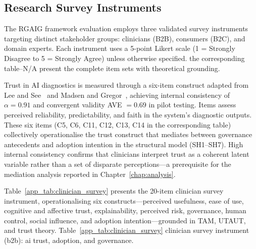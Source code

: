 \subsection{Research Survey Instruments}
\label{app_sec:survey_instruments}

The RGAIG framework evaluation employs three validated survey instruments targeting distinct stakeholder groups: clinicians (B2B), consumers (B2C), and domain experts. Each instrument uses a 5-point Likert scale (1 = Strongly Disagree to 5 = Strongly Agree) unless otherwise specified. the corresponding table--N/A present the complete item sets with theoretical grounding.

Trust in AI diagnostics is measured through a six-item construct adapted from Lee and See~\cite{lee2004trust} and Madsen and Gregor~\cite{madsen2000measuring}, achieving internal consistency of $\alpha = 0.91$ and convergent validity AVE $= 0.69$ in pilot testing. Items assess perceived reliability, predictability, and faith in the system's diagnostic outputs. These six items (C5, C6, C11, C12, C13, C14 in the corresponding table) collectively operationalise the trust construct that mediates between governance antecedents and adoption intention in the structural model (SH1--SH7). High internal consistency confirms that clinicians interpret trust as a coherent latent variable rather than a set of disparate perceptions---a prerequisite for the mediation analysis reported in Chapter~\ref{chap:analysis}.

\noindent Table~\ref{app_tab:clinician_survey} presents the 20-item clinician survey instrument, operationalising six constructs---perceived usefulness, ease of use, cognitive and affective trust, explainability, perceived risk, governance, human control, social influence, and adoption intention---grounded in TAM, UTAUT, and trust theory.
\noindent Table~\ref{app_tab:clinician_survey} clinician survey instrument (b2b): ai trust, adoption, and governance.

